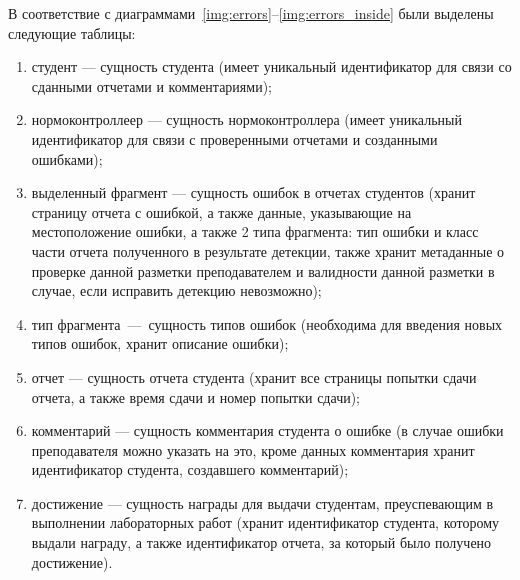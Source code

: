 В соответствие с диаграммами~\ref{img:errors}--\ref{img:errors_inside} были выделены следующие таблицы:
\begin{enumerate}
	\item студент --- сущность студента (имеет уникальный идентификатор для связи со сданными отчетами и комментариями);
	\item нормоконтроллеер --- сущность нормоконтроллера (имеет уникальный идентификатор для связи с проверенными отчетами и созданными ошибками);
	\item выделенный фрагмент --- сущность ошибок в отчетах студентов (хранит страницу отчета с ошибкой, а также данные, указывающие на местоположение ошибки, а также 2 типа фрагмента: тип ошибки и класс части отчета полученного в результате детекции, также хранит метаданные о проверке данной разметки преподавателем и валидности данной разметки в случае, если исправить детекцию невозможно);
	\item тип фрагмента~---~сущность типов ошибок (необходима для введения новых типов ошибок, хранит описание ошибки);
	\item отчет --- сущность отчета студента (хранит все страницы попытки сдачи отчета, а также время сдачи и номер попытки сдачи);
	\item комментарий --- сущность комментария студента о ошибке (в случае ошибки преподавателя можно указать на это, кроме данных комментария хранит идентификатор студента, создавшего комментарий);
	\item достижение --- сущность награды для выдачи студентам, преуспевающим в выполнении лабораторных работ (хранит идентификатор студента, которому выдали награду, а также идентификатор отчета, за который было получено достижение).
\end{enumerate}

